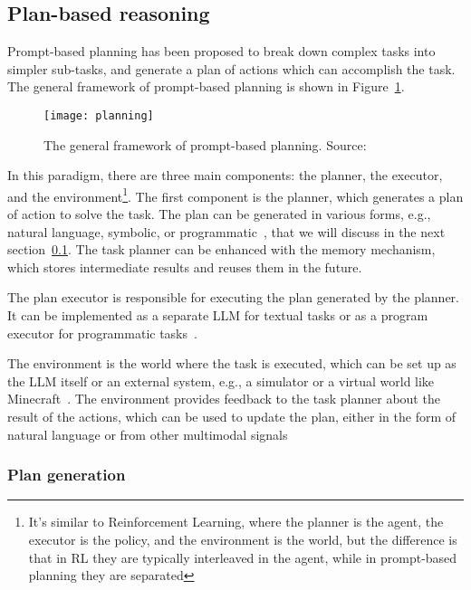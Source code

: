 \subsection{Plan-based reasoning}
\label{subsec:plan-based}

Prompt-based planning has been proposed to break down complex tasks into simpler sub-tasks, and generate a plan of actions which can accomplish the task.
The general framework of prompt-based planning is shown in Figure~\ref{fig:planning}.

\begin{figure}[h!]
	\centering
	\texttt{[image: planning]}
	\caption{The general framework of prompt-based planning. Source: \textcite{survey}}
	\label{fig:planning}
\end{figure}

In this paradigm, there are three main components: the planner, the executor, and the environment\footnote{It's similar to Reinforcement Learning, where the planner is the agent, the executor is the policy, and the environment is the world, but the difference is that in RL they are typically interleaved in the agent, while in prompt-based planning they are separated}.
The first component is the planner, which generates a plan of action to solve the task.
The plan can be generated in various forms, e.g., natural language, symbolic, or programmatic~\cite{gao2022pal, zhou2022least}, that we will discuss in the next section~\ref{subsec:plan-based}.
The task planner can be enhanced with the memory mechanism, which stores intermediate results and reuses them in the future.

The plan executor is responsible for executing the plan generated by the planner.
It can be implemented as a separate LLM for textual tasks or as a program executor for programmatic tasks~\cite{wang2023plan, gao2022pal}.

The environment is the world where the task is executed, which can be set up as the LLM itself or an external system, e.g., a simulator or a virtual world like Minecraft~\cite{yao2023tree, wang2023voyager}.
The environment provides feedback to the task planner about the result of the actions, which can be used to update the plan, either in the form of natural language or from other multimodal signals~\cite{shinn2023reflexion, lu2023multimodal}

\subsubsection{Plan generation}
\label{subsubsec:plan-generation}

